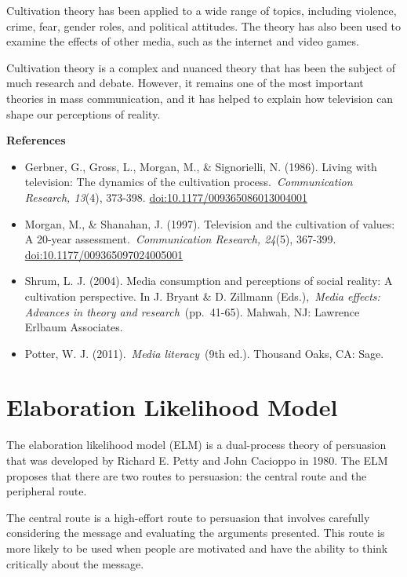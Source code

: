 \documentclass[
  b5paper]{book}
\begin{document}
Cultivation theory has been applied to a wide range of topics, including violence, crime, fear, gender roles, and political attitudes. The theory has also been used to examine the effects of other media, such as the internet and video games.

Cultivation theory is a complex and nuanced theory that has been the subject of much research and debate. However, it remains one of the most important theories in mass communication, and it has helped to explain how television can shape our perceptions of reality.

\textbf{References}

\begin{itemize}
\item
  Gerbner, G., Gross, L., Morgan, M., \& Signorielli, N. (1986). Living with television: The dynamics of the cultivation process.~\emph{Communication Research, 13}(4), 373-398. \url{doi:10.1177/009365086013004001}
\item
  Morgan, M., \& Shanahan, J. (1997). Television and the cultivation of values: A 20-year assessment.~\emph{Communication Research, 24}(5), 367-399. \url{doi:10.1177/009365097024005001}
\item
  Shrum, L. J. (2004). Media consumption and perceptions of social reality: A cultivation perspective. In J. Bryant \& D. Zillmann (Eds.),~\emph{Media effects: Advances in theory and research}~(pp.~41-65). Mahwah, NJ: Lawrence Erlbaum Associates.
\item
  Potter, W. J. (2011).~\emph{Media literacy}~(9th ed.). Thousand Oaks, CA: Sage.
\end{itemize}

\hypertarget{elaboration-likelihood-model}{%
\section{Elaboration Likelihood Model}\label{elaboration-likelihood-model}}

The elaboration likelihood model (ELM) is a dual-process theory of persuasion that was developed by Richard E. Petty and John Cacioppo in 1980. The ELM proposes that there are two routes to persuasion: the central route and the peripheral route.

The central route is a high-effort route to persuasion that involves carefully considering the message and evaluating the arguments presented. This route is more likely to be used when people are motivated and have the ability to think critically about the message.
\end{document}
